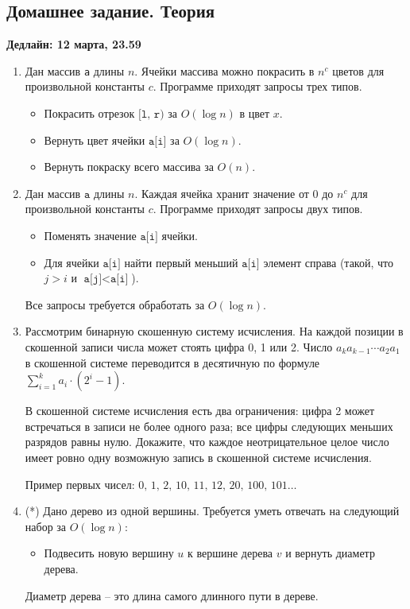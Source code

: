 \subsection{Домашнее задание. Теория}
\textbf{Дедлайн: 12 марта, 23.59}

\begin{enumerate}

  \item Дан массив \texttt{a} длины $n$. Ячейки массива можно покрасить в $n^c$ цветов
  для произвольной константы $c$. Программе приходят запросы трех типов.
  \begin{itemize}
    \item Покрасить отрезок $\texttt{[l, r)}$ за $O(\log n)$ в цвет $x$.
    \item Вернуть цвет ячейки $\texttt{a[i]}$ за $O(\log n)$.
    \item Вернуть покраску всего массива за $O(n)$.
  \end{itemize}

  \item Дан массив $\texttt{a}$ длины $n$. Каждая ячейка хранит значение от $0$ до $n^c$
    для произвольной константы $c$.
    Программе приходят запросы двух типов.
    \begin{itemize}
      \item Поменять значение $\texttt{a[i]}$ ячейки.
      \item Для ячейки $\texttt{a[i]}$ найти первый меньший $\texttt{a[i]}$ элемент справа (такой, что $j > i$ и $\texttt{a[j]} < \texttt{a[i]}$).
    \end{itemize}
    Все запросы требуется обработать за $O(\log n)$.	

  \item Рассмотрим бинарную скошенную систему исчисления. На каждой позиции в 
  скошенной записи числа может стоять цифра 0, 1 или 2. Число 
  $a_k a_{k-1} \cdots a_2 a_1$ в скошенной системе переводится
  в десятичную по формуле $\sum_{i = 1}^k a_i \cdot (2^i - 1)$.

  В скошенной системе исчисления есть два ограничения: цифра 2 может 
  встречаться в записи не более одного раза; все цифры следующих меньших 
  разрядов равны нулю. Докажите, что каждое неотрицательное целое число имеет 
  ровно одну возможную запись в скошенной системе исчисления.

  Пример первых чисел: $0,\,1,\,2,\,10,\,11,\,12,\,20,\,100,\,101\dots$
  
  \item (*) Дано дерево из одной вершины. Требуется уметь отвечать на следующий
  набор за $O(\log n)$:
  \begin{itemize} 
    \item Подвесить новую вершину $u$ к вершине дерева $v$ и вернуть диаметр 
  дерева.
  \end{itemize}
  Диаметр дерева -- это длина самого длинного пути в дереве.

\end{enumerate}

